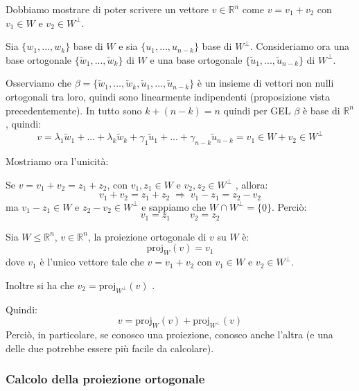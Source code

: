 \documentclass[
  a4paper,
]{article}
\begin{document}
\begin{proofbox}
Dobbiamo mostrare di poter scrivere un vettore \(v \in \mathbb{R}^n\)
come \(v = v_1 + v_2\) con \(v_1 \in W\) e \(v_2 \in W^{\perp}\).

Sia \(\{w_1, ..., w_k\}\) base di \(W\) e sia \(\{u_1,\dots, u_{n-k}\}\)
base di \(W^\perp\). Consideriamo ora una base ortogonale
\(\{\widetilde{w}_1, ..., \widetilde{w}_k\}\) di \(W\) e una base
ortogonale \(\{\widetilde{u}_1, ..., \widetilde{u}_{n-k}\}\) di
\(W^{\perp}\).

Osserviamo che
\(\beta = \{\widetilde{w}_1,\dots, \widetilde{w}_k, \widetilde{u}_1, \dots, \widetilde{u}_{n-k}\}\)
è un insieme di vettori non nulli ortogonali tra loro, quindi sono
linearmente indipendenti (proposizione vista precedentemente). In tutto
sono \(k + (n-k) = n\) quindi per GEL \(\beta\) è base di
\(\mathbb{R}^n\), quindi: \[
v = \lambda_1 \widetilde{w}_1 + ... + \lambda_k\widetilde{w}_k + \gamma_1 \widetilde{u}_1 + ... + \gamma_{n-k} \widetilde{u}_{n-k} = v_1 \in W + v_2 \in W^\perp
\]

Mostriamo ora l'unicità:

Se \(v = v_1 + v_2 = z_1 + z_2\), con \(v_1, z_1 \in W\) e
\(v_2, z_2 \in W^{\perp}\) , allora: \[
v_1 + v_2 = z_1 + z_2 \;\Longrightarrow\; v_1 - z_1 = z_2 - v_2
\] ma \(v_1 - z_1 \in W\) e \(z_2 - v_2 \in W^{\perp}\) e sappiamo che
\(W \cap W^{\perp} = \{\underline{0}\}\). Perciò: \[
v_1 = z_1 \qquad v_2 = z_2
\]
\end{proofbox}

\begin{definitionbox}
Sia \(W \leq \mathbb{R}^n\), \(v \in \mathbb{R}^n\), la proiezione
ortogonale di \(v\) su \(W\) è: \[
\text{proj}_W(v) = v_1
\] dove \(v_1\) è l'unico vettore tale che \(v= v_1 + v_2\) con
\(v_1 \in W\) e \(v_2 \in W^\perp\).
\end{definitionbox}

\begin{observationbox}
Inoltre si ha che \(v_2 = \text{proj}_{W^\perp}(v)\) .

Quindi: \[
v = \text{proj}_W(v) + \text{proj}_{W^\perp}(v)
\] Perciò, in particolare, se conosco una proiezione, conosco anche
l'altra (e una delle due potrebbe essere più facile da calcolare).
\end{observationbox}

\hypertarget{calcolo-della-proiezione-ortogonale}{%
\subsubsection{Calcolo della proiezione
ortogonale}\label{calcolo-della-proiezione-ortogonale}}
\end{document}
